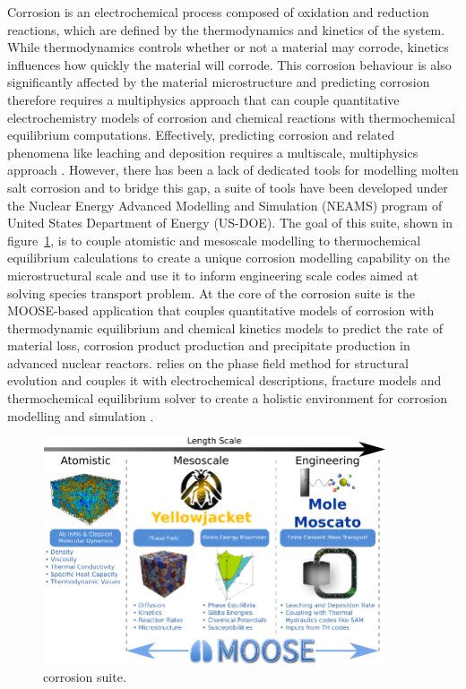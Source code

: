 	Corrosion is an electrochemical process composed of oxidation and reduction reactions, which are defined by the thermodynamics and kinetics of the system. While thermodynamics controls whether or not a material may corrode, kinetics influences how quickly the material will corrode. This corrosion behaviour is also significantly affected by the material microstructure and predicting corrosion therefore requires a multiphysics approach that can couple quantitative electrochemistry models of corrosion and chemical reactions with thermochemical equilibrium computations. Effectively, predicting corrosion and related phenomena like leaching and deposition requires a multiscale, multiphysics approach \cite{Mcmurray:2018aa}. However, there has been a lack of dedicated tools for modelling molten salt corrosion and to bridge this gap, a suite of tools have been developed under the Nuclear Energy Advanced Modelling and Simulation (NEAMS) program of United States Department of Energy (US-DOE). The goal of this suite, shown in figure~\ref{fig:yj_suite}, is to couple atomistic and mesoscale modelling to thermochemical equilibrium calculations to create a unique corrosion modelling capability on the microstructural scale and use it to inform engineering scale codes aimed at solving species transport problem. At the core of the corrosion suite is the MOOSE-based application {\YJ} that couples quantitative models of corrosion with thermodynamic equilibrium and chemical kinetics models to predict the rate of material loss, corrosion product production and precipitate production in advanced nuclear reactors. {\YJ} relies on the phase field method for structural evolution and couples it with electrochemical descriptions, fracture models and thermochemical equilibrium solver to create a holistic environment for corrosion modelling and simulation \cite{Bhave:2022aa}.
	\begin{figure}[htb]
		\centering
		\includegraphics[width=0.9\textwidth]{figures/chapter-1/Yellowjacket_Suite.png}
		\caption{{\YJ} corrosion suite.}
		\label{fig:yj_suite}
	\end{figure}

